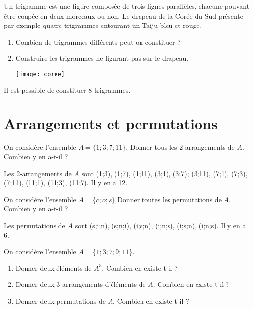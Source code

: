 \documentclass[11pt,fleqn, openany]{book} %
\begin{document}
\begin{exercise}Un trigramme est une figure composée de trois lignes parallèles, chacune pouvant être coupée en deux morceaux ou non. Le drapeau de la Corée du Sud présente par exemple quatre trigrammes entourant un Taiju bleu et rouge.
\begin{enumerate}
\item Combien de trigrammes différents peut-on constituer ?

\item Construire les trigrammes ne figurant pas sur le drapeau.

\begin{center}
\texttt{[image: coree]}
\end{center}
\end{enumerate}
\end{exercise}

\begin{solution}Il est possible de constituer 8 trigrammes. \end{solution}



\section*{Arrangements et permutations}

\begin{exercise}On considère l'ensemble $A=\{1;3;7;11\}$. Donner tous les 2-arrangements de $A$. Combien y en a-t-il ?\end{exercise}

\begin{solution}Les 2-arrangements de $A$ sont (1;3), (1;7), (1;11), (3;1), (3;7); (3;11), (7;1), (7;3), (7;11), (11;1), (11;3), (11;7). Il y en a 12.\end{solution}



\begin{exercise}On considère l'ensemble $A=\{c;o;s\}$ Donner toutes les permutations de $A$. Combien y en a-t-il ?\end{exercise}

\begin{solution}Les permutations de $A$ sont (s;i;n), (s;n;i), (i;s;n), (i;n;s), (i;s;n), (i;n;s). Il y en a 6.\end{solution}




\begin{exercise}
On considère l'ensemble $A=\{1;3;7;9;11\}$.
\begin{enumerate}
\item Donner deux éléments de $A^3$. Combien en existe-t-il ?
\item Donner deux 3-arrangements d'éléments de $A$. Combien en existe-t-il ?
\item Donner deux permutations de $A$. Combien en existe-t-il ?
\end{enumerate}\end{exercise}
\end{document}
